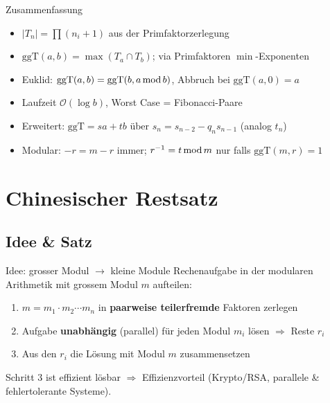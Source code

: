 \documentclass[a4paper, fontsize=7pt]{scrartcl}
\def\oof{\mathcal{O}}
\newcommand{\Mod}{\mskip3mu\mathrm{mod}\mskip3mu}
\begin{document}
\begin{subbox}{Zusammenfassung}
\begin{itemize}
    \item $|T_n| = \prod (n_i + 1)$ aus der Primfaktorzerlegung
    \item $\mathrm{ggT}(a,b) = \max(T_a \cap T_b)$; via Primfaktoren
          $\min$-Exponenten
    \item Euklid: $\mathrm{ggT}(a,b) = \mathrm{ggT}(b, a \Mod b)$,
          Abbruch bei $\mathrm{ggT}(a,0) = a$
    \item Laufzeit $\oof(\log b)$, Worst Case = Fibonacci-Paare
    \item Erweitert: $\mathrm{ggT} = s a + t b$ über
          $s_n = s_{n-2} - q_n s_{n-1}$ (analog $t_n$)
    \item Modular: $-r = m - r$ immer; $r^{-1} = t \Mod m$ nur falls
          $\mathrm{ggT}(m,r) = 1$
\end{itemize}
\end{subbox}

\section{Chinesischer Restsatz}

\subsection{Idee \& Satz}

\begin{mainbox}{Idee: grosser Modul $\to$ kleine Module}
Rechenaufgabe in der modularen Arithmetik mit grossem Modul $m$ aufteilen:
\begin{enumerate}
    \item $m = m_1 \cdot m_2 \cdots m_n$ in \textbf{paarweise teilerfremde}
          Faktoren zerlegen
    \item Aufgabe \textbf{unabhängig} (parallel) für jeden Modul $m_i$
          lösen $\Rightarrow$ Reste $r_i$
    \item Aus den $r_i$ die Lösung mit Modul $m$ zusammensetzen
\end{enumerate}
Schritt 3 ist effizient lösbar $\Rightarrow$ Effizienzvorteil
(Krypto/RSA, parallele \& fehlertolerante Systeme).
\end{mainbox}
\end{document}
